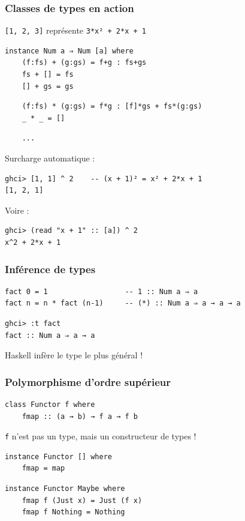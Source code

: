 \documentclass[10pt]{beamer}
\begin{document}
\begin{frame}[fragile]
\frametitle{Classes de types en action}

\verb|[1, 2, 3]| représente \verb|3*x² + 2*x + 1|

\begin{verbatim}
instance Num a ⇒ Num [a] where
    (f:fs) + (g:gs) = f+g : fs+gs
    fs + [] = fs
    [] + gs = gs
\end{verbatim}
\pause
\begin{verbatim}
    (f:fs) * (g:gs) = f*g : [f]*gs + fs*(g:gs)
    _ * _ = []
\end{verbatim}
\pause
\begin{verbatim}
    ...
\end{verbatim}

Surcharge automatique :

\begin{verbatim}
ghci> [1, 1] ^ 2    -- (x + 1)² = x² + 2*x + 1
[1, 2, 1]
\end{verbatim}

\pause

Voire :

\begin{verbatim}
ghci> (read "x + 1" :: [a]) ^ 2
x^2 + 2*x + 1
\end{verbatim}

\end{frame}



\begin{frame}[fragile]
\frametitle{Inférence de types}

\begin{verbatim}
fact 0 = 1                  -- 1 :: Num a ⇒ a
fact n = n * fact (n-1)     -- (*) :: Num a ⇒ a → a → a
\end{verbatim}
\pause
\begin{verbatim}
ghci> :t fact
fact :: Num a ⇒ a → a
\end{verbatim}

Haskell infère le type le plus général !
\end{frame}



\begin{frame}[fragile]
\frametitle{Polymorphisme d'ordre supérieur}
\begin{verbatim}
class Functor f where
    fmap :: (a → b) → f a → f b
\end{verbatim}
\pause
\verb|f| n'est pas un type, mais un constructeur de types !
\pause
\begin{verbatim}
instance Functor [] where
    fmap = map
\end{verbatim}
\pause
\begin{verbatim}
instance Functor Maybe where
    fmap f (Just x) = Just (f x)
    fmap f Nothing = Nothing
\end{verbatim}
\end{frame}
\end{document}
